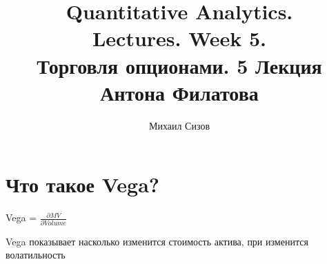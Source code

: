 \documentclass{article}
\title{Quantitative Analytics.\\
Lectures. Week 5. \\
Торговля опционами. 5 Лекция Антона Филатова}
\author{Михаил Сизов}
\begin{document}
\maketitle

\setcounter{tocdepth}{1} %
\renewcommand\contentsname{Contents}
\tableofcontents
\newpage




\renewcommand{\labelitemi}{\tiny$\bullet$}
\renewcommand{\figurename}{Fig.}

 
\section{Что такое Vega?}
\begin{center}  
Vega = $\frac{\partial MV}{\partial Volume}$ \\
\end{center}
Vega показывает насколько изменится стоимость актива, при изменится волатильность \\
\end{document}
